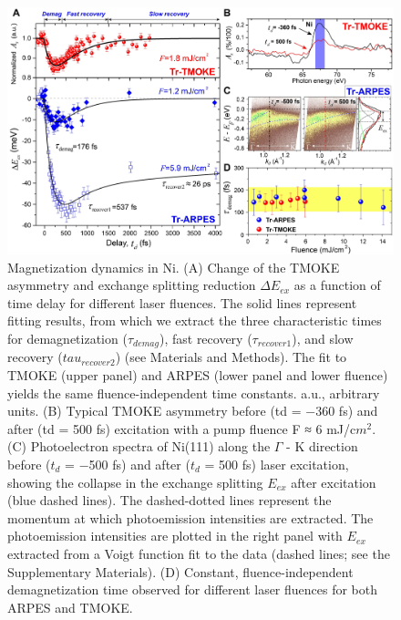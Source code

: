 \begin{figure}[htbp]
	\begin{center}
		\includegraphics[width=150mm]{aap9744_Figure_fig2_seq2_v1.pdf}
	\end{center}
	\caption{Magnetization dynamics in Ni. (A) Change of the TMOKE asymmetry and exchange splitting reduction $\Delta E_{ex}$ as a function of time delay for different laser fluences. The solid lines represent fitting results, from which we extract the three characteristic times for demagnetization ($\tau_{demag}$), fast recovery ($\tau_{recover1}$), and slow recovery ($tau_{recover2}$) (see Materials and Methods). The fit to TMOKE (upper panel) and ARPES (lower panel and lower fluence) yields the same fluence-independent time constants. a.u., arbitrary units. (B) Typical TMOKE asymmetry before (td = −360 fs) and after (td = 500 fs) excitation with a pump fluence F ≈ 6 mJ/c$m^2$.(C) Photoelectron spectra of Ni(111) along the $\Gamma$ - K direction before ($t_{d}$ = −500 fs) and after ($t_{d}$ = 500 fs) laser excitation, showing the collapse in the exchange splitting $E_{ex}$ after excitation (blue dashed lines). The dashed-dotted lines represent the momentum at which photoemission intensities are extracted. The photoemission intensities are plotted in the right panel with $E_{ex}$ extracted from a Voigt function fit to the data (dashed lines; see the Supplementary Materials). (D) Constant, fluence-independent demagnetization time observed for different laser fluences for both ARPES and TMOKE.}
	\label{fig: Nifig2}
\end{figure}


